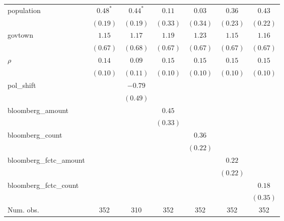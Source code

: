 \begin{table}[!h]
\begin{center}
\begin{tabular}{l c c c c c c }
population              & $0.48^{*}$   & $0.44^{*}$   & $0.11$       & $0.03$       & $0.36$       & $0.43$       \\
                        & $(0.19)$     & $(0.19)$     & $(0.33)$     & $(0.34)$     & $(0.23)$     & $(0.22)$     \\
govtown                 & $1.15$       & $1.17$       & $1.19$       & $1.23$       & $1.15$       & $1.16$       \\
                        & $(0.67)$     & $(0.68)$     & $(0.67)$     & $(0.67)$     & $(0.67)$     & $(0.67)$     \\
$\rho$                  & $0.14$       & $0.09$       & $0.15$       & $0.15$       & $0.15$       & $0.15$       \\
                        & $(0.10)$     & $(0.11)$     & $(0.10)$     & $(0.10)$     & $(0.10)$     & $(0.10)$     \\
pol\_shift              &              & $-0.79$      &              &              &              &              \\
                        &              & $(0.49)$     &              &              &              &              \\
bloomberg\_amount       &              &              & $0.45$       &              &              &              \\
                        &              &              & $(0.33)$     &              &              &              \\
bloomberg\_count        &              &              &              & $0.36$       &              &              \\
                        &              &              &              & $(0.22)$     &              &              \\
bloomberg\_fctc\_amount &              &              &              &              & $0.22$       &              \\
                        &              &              &              &              & $(0.22)$     &              \\
bloomberg\_fctc\_count  &              &              &              &              &              & $0.18$       \\
                        &              &              &              &              &              & $(0.35)$     \\
\midrule
Num. obs.               & 352          & 310          & 352          & 352          & 352          & 352          \\

\end{tabular}
\end{center}
\end{table}
